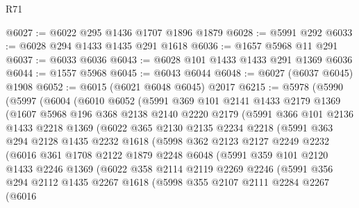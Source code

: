\begin{lexlean}{R71}
\begin{coremodule}
@6027 := @6022 @295 @1436 @1707 @1896 @1879
@6028 := @5991 @292
@6033 := @6028 @294 @1433 @1435 @291 @1618
@6036 := @1657 @5968 @11 @291
@6037 := @6033 @6036
@6043 := @6028 @101 @1433 @1433 @291 @1369 @6036
@6044 := @1557 @5968
@6045 := @6043 @6044
@6048 := @6027 (@6037 @6045) @1908
@6052 := @6015 (@6021 @6048 @6045) @2017
@6215 := @5978
    (@5990
      (@5997
        (@6004
          (@6010
            @6052
            (@5991
              @369
              @101
              @2141
              @1433
              @2179
              @1369
              (@1607
                @5968
                @196
                @368
                @2138
                @2140
                @2220
                @2179
                (@5991
                  @366
                  @101
                  @2136
                  @1433
                  @2218
                  @1369
                  (@6022
                    @365
                    @2130
                    @2135
                    @2234
                    @2218
                    (@5991
                      @363
                      @294
                      @2128
                      @1435
                      @2232
                      @1618
                      (@5998
                        @362
                        @2123
                        @2127
                        @2249
                        @2232
                        (@6016
                          @361
                          @1708
                          @2122
                          @1879
                          @2248
                          @6048
                          (@5991
                            @359
                            @101
                            @2120
                            @1433
                            @2246
                            @1369
                            (@6022
                              @358
                              @2114
                              @2119
                              @2269
                              @2246
                              (@5991
                                @356
                                @294
                                @2112
                                @1435
                                @2267
                                @1618
                                (@5998
                                  @355
                                  @2107
                                  @2111
                                  @2284
                                  @2267
                                  (@6016

\end{coremodule}
\end{lexlean}

